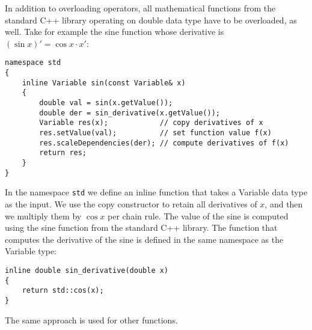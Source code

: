 \documentclass[10pt]{ijnam}
\theoremstyle{definition}
\begin{document}
In addition to overloading operators, all mathematical functions from the standard C++ library 
operating on double data type have to be overloaded, as well. Take for example the
sine function whose derivative is $(\sin x)' = \cos x \cdot x'$:
\begin{lstlisting}
namespace std
{
    inline Variable sin(const Variable& x)
    {                                         
        double val = sin(x.getValue());                         
        double der = sin_derivative(x.getValue());               
        Variable res(x);            // copy derivatives of x
        res.setValue(val);          // set function value f(x)
        res.scaleDependencies(der); // compute derivatives of f(x)
        return res;
    }
}
\end{lstlisting}
In the namespace \texttt{std} we define an inline function that takes a
Variable data type as the input. We use the copy constructor to retain 
all derivatives of $x$, and then we multiply them by $\cos x$ per 
chain rule. The value of the sine is computed using the sine function from the
standard C++ library. The function that computes the derivative of the sine
is defined in the same namespace as the Variable type:
\begin{lstlisting}
inline double sin_derivative(double x)
{
    return std::cos(x);
}
\end{lstlisting}
The same approach is used for other functions. 
\end{document}
